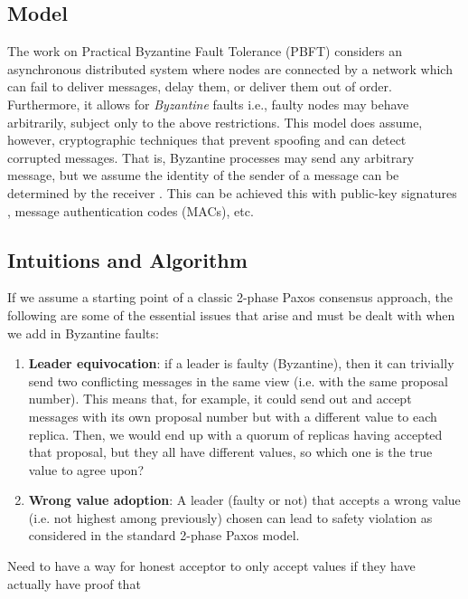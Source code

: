 \documentclass[10pt,a4paper]{article}
\begin{document}
\subsection{Model}
 
The work on Practical Byzantine Fault Tolerance (PBFT) \cite{1999castropbft} considers an asynchronous distributed system where nodes are connected by a network which can fail to deliver messages, delay them, or deliver them out of order. Furthermore, it allows for \textit{Byzantine} faults i.e., faulty nodes may behave arbitrarily, subject only to the above restrictions. This model does assume, however, cryptographic techniques that prevent spoofing and can detect corrupted messages. That is, Byzantine processes may send any arbitrary message, but we assume the identity of the sender of a message can be determined by the receiver \cite{2011lamport}. This can be achieved this with public-key signatures \cite{1978rivestcrypto}, message authentication codes (MACs), etc.

\subsection{Intuitions and Algorithm}

If we assume a starting point of a classic 2-phase Paxos consensus approach, the following are some of the essential issues that arise and must be dealt with when we add in Byzantine faults:
\begin{enumerate}
    \item \textbf{Leader equivocation}: if a leader is faulty (Byzantine), then it can trivially send two conflicting messages in the same view (i.e. with the same proposal number). This means that, for example, it could send out and accept messages with its own proposal number but with a different value to each replica. Then, we would end up with a quorum of replicas having accepted that proposal, but they all have different values, so which one is the true value to agree upon?
    \item \textbf{Wrong value adoption}: A leader (faulty or not) that accepts a wrong value  (i.e. not highest among previously) chosen can lead to safety violation as considered in the standard 2-phase Paxos model.
\end{enumerate}

Need to have a way for honest acceptor to only accept values if they have actually have proof that 


\end{document}
